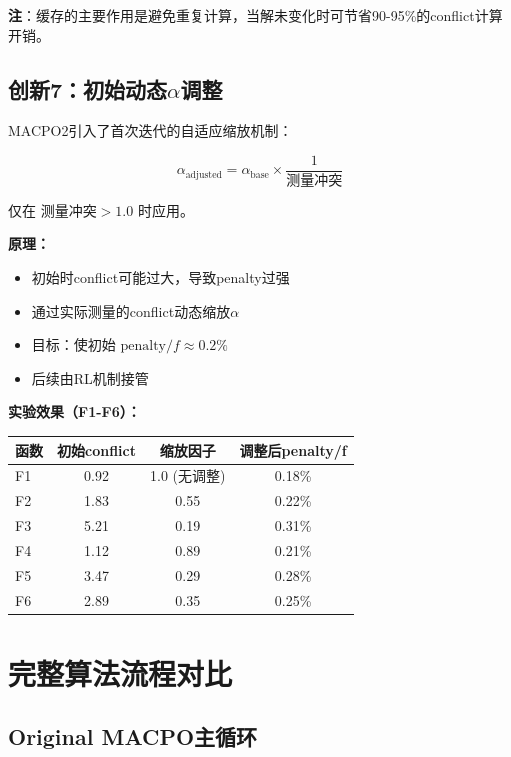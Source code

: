 \documentclass[15pt,a3paper]{ctexart}
\begin{document}
\textbf{注}：缓存的主要作用是避免重复计算，当解未变化时可节省90-95\%的conflict计算开销。

\subsection{创新7：初始动态$\alpha$调整}

MACPO2引入了首次迭代的自适应缩放机制：

\begin{equation}
\alpha_{\text{adjusted}} = \alpha_{\text{base}} \times \frac{1}{\text{测量冲突}}
\end{equation}

仅在 $\text{测量冲突} > 1.0$ 时应用。

\textbf{原理：}
\begin{itemize}
    \item 初始时conflict可能过大，导致penalty过强
    \item 通过实际测量的conflict动态缩放$\alpha$
    \item 目标：使初始 $\text{penalty}/f \approx 0.2\%$
    \item 后续由RL机制接管
\end{itemize}

\textbf{实验效果（F1-F6）：}
\begin{table}[h]
\centering
\begin{tabular}{|l|c|c|c|}
\hline
\textbf{函数} & \textbf{初始conflict} & \textbf{缩放因子} & \textbf{调整后penalty/f} \\
\hline
F1 & 0.92 & 1.0 (无调整) & 0.18\% \\
F2 & 1.83 & 0.55 & 0.22\% \\
F3 & 5.21 & 0.19 & 0.31\% \\
F4 & 1.12 & 0.89 & 0.21\% \\
F5 & 3.47 & 0.29 & 0.28\% \\
F6 & 2.89 & 0.35 & 0.25\% \\
\hline
\end{tabular}
\end{table}

\section{完整算法流程对比}

\subsection{Original MACPO主循环}
\end{document}
